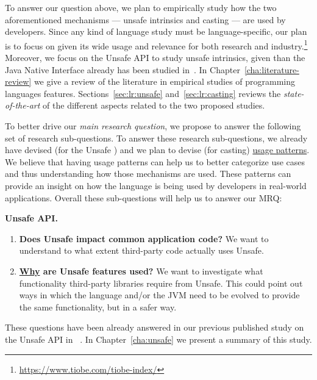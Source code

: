 To answer our question above,
we plan to empirically study how the two aforementioned mechanisms
--- unsafe intrinsics and casting ---
are used by developers.
Since any kind of language study must be language-specific,
our plan is to focus on \java{} given its wide usage and relevance for both
research and industry.\footnote{\url{https://www.tiobe.com/tiobe-index/}}
Moreover, we focus on the \java{} Unsafe API to study unsafe intrinsics,
given than the Java Native Interface already has been studied in~\cite{tanSafeJavaNative2006,tanEmpiricalSecurityStudy2008,kondohFindingBugsJava2008,sunNativeGuardProtectingAndroid2014,liFindingBugsExceptional2009}.
In Chapter~\ref{cha:literature-review} we give a review of the literature in empirical studies of programming languages features.
Sections~\ref{sec:lr:unsafe} and~\ref{sec:lr:casting} reviews the \emph{state-of-the-art} of the different aspects related to the two proposed studies.

To better drive our \emph{main research question},
we propose to answer the following set of research sub-questions.
To answer these research sub-questions,
we already have devised (for the Unsafe \api{}) and
we plan to devise (for casting)
\underline{usage patterns}.
We believe that having usage patterns can help us to better categorize use cases and thus understanding how those mechanisms are used.
These patterns can provide an insight on how the language is being used by developers in real-world applications.
Overall these sub-questions will help us to answer our MRQ:

\textbf{ Unsafe API.}
\begin{enumerate}[label=$URQ\arabic*:$,ref=$URQ\arabic*$,leftmargin=3.4\parindent]
\item\label{unsafe:rq1}
{\bf Does Unsafe impact common application code?}
We want to understand to what extent third-party code actually uses Unsafe.

\item\label{unsafe:rq2}
{\bf \underline{Why} are Unsafe features used?}
We want to investigate what functionality third-party libraries require from Unsafe.
This could point out ways in which the \java{} language and/or the JVM need to be evolved to provide the same functionality, but in a safer way.
\end{enumerate}

These questions have been already answered in our previous published study on the Unsafe API in \java{}~\cite{mastrangeloUseYourOwn2015}.
In Chapter~\ref{cha:unsafe} we present a summary of this study.

